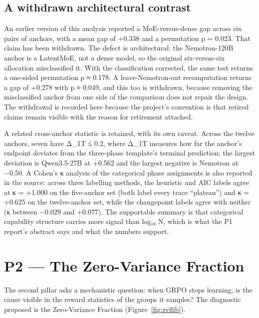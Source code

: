 \documentclass[12pt,a4paper]{report}
\begin{document}
\subsection{A withdrawn architectural
contrast}\label{a-withdrawn-architectural-contrast}

An earlier version of this analysis reported a MoE-versus-dense gap
across six pairs of anchors, with a mean gap of +0.338 and a permutation
p = 0.023. That claim has been withdrawn. The defect is architectural:
the Nemotron-120B anchor is a LatentMoE, not a dense model, so the
original six-versus-six allocation misclassified it. With the
classification corrected, the same test returns a one-sided permutation
p ≈ 0.178. A leave-Nemotron-out recomputation returns a gap of +0.278
with p ≈ 0.049, and this too is withdrawn, because removing the
misclassified anchor from one side of the comparison does not repair the
design. The withdrawal is recorded here because the project's convention
is that retired claims remain visible with the reason for retirement
attached.

A related cross-anchor statistic is retained, with its own caveat.
Across the twelve anchors, seven have \textbar Δ\_1T\textbar{} ≤ 0.2,
where Δ\_1T measures how far the anchor's endpoint deviates from the
three-phase template's terminal prediction; the largest deviation is
Qwen3.5-27B at +0.562 and the largest negative is Nemotron at −0.50. A
Cohen's κ analysis of the categorical phase assignments is also reported
in the source: across three labelling methods, the heuristic and AIC
labels agree at κ = +1.000 on the five-anchor set (both label every
trace ``plateau'') and κ = +0.625 on the twelve-anchor set, while the
changepoint labels agree with neither (κ between −0.029 and +0.077). The
supportable summary is that categorical capability structure carries
more signal than log₁₀ N, which is what the P1 report's abstract says
and what the numbers support.

\section{P2 --- The Zero-Variance
Fraction}\label{p2-the-zero-variance-fraction}

The second pillar asks a mechanistic question: when GRPO stops learning,
is the cause visible in the reward statistics of the groups it samples?
The diagnostic proposed is the Zero-Variance Fraction (Figure~\ref{fig:zvflib}).
\end{document}
